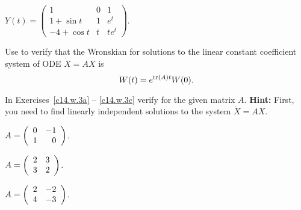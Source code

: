 \documentclass{ximera}
\begin{document}
\begin{exercise} \label{c14.4.1d}
$Y(t) = \left(\begin{array}{ccc}
1 & 0 & 1\\  1 + \sin t & 1 & e^t \\ -4 + \cos t & t & te^t 
\end{array}\right)$.
\end{exercise}

\begin{exercise}  \label{c14.w.2}
Use  to verify that the Wronskian for solutions to the linear 
constant coefficient system of ODE $\dot{X}=AX$ is
\begin{equation}  \label{E:ccw}
W(t) = e^{{\rm tr}(A)t}W(0).
\end{equation}
\end{exercise}

\noindent In Exercises~\ref{c14.w.3a} -- \ref{c14.w.3c} verify  
for the given matrix $A$.  {\bf Hint:} First, you need to find linearly 
independent solutions to the system $\dot{X}=AX$.
\begin{exercise} 	\label{c14.w.3a}
$A = \left(\begin{array}{rr} 0 & -1\\ 1 &0\end{array}\right)$.
\end{exercise}
\begin{exercise} 	\label{c14.w.3b}
$A = \left(\begin{array}{rr} 2 & 3\\ 3 &2\end{array}\right)$.
\end{exercise}
\begin{exercise} 	\label{c14.w.3c}
$A = \left(\begin{array}{rr} 2 & -2\\ 4 &-3\end{array}\right)$.
\end{exercise}

 
\end{document}
